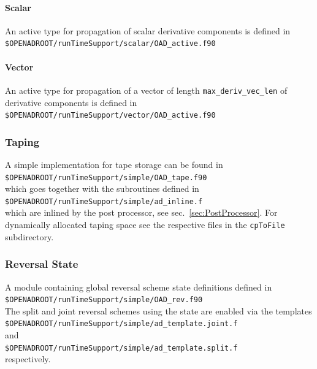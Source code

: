\documentclass{book}
\newcommand{\refsec}[1]{{sec.~\ref{#1}}}
\begin{document}
\paragraph{Scalar}
An active type for propagation of scalar derivative components is defined in \\[1ex]
\hspace*{.3cm}\lstinline{$OPENADROOT/runTimeSupport/scalar/OAD_active.f90} %

\paragraph{Vector}
An active type for propagation of a vector of length 
\lstinline{max_deriv_vec_len} of derivative components is defined in \\[1ex]
\hspace*{.3cm}\lstinline{$OPENADROOT/runTimeSupport/vector/OAD_active.f90} %

\subsubsection{Taping}
A simple implementation for  tape storage can be found in \\[1ex]
\hspace*{.3cm}\lstinline{$OPENADROOT/runTimeSupport/simple/OAD_tape.f90}\\[1ex] %
which goes together with the subroutines defined in \\[1ex]
\hspace*{.3cm}\lstinline{$OPENADROOT/runTimeSupport/simple/ad_inline.f}\\[1ex] %
which are inlined by the post processor, see \refsec{sec:PostProcessor}.
For dynamically allocated taping space see the respective files in the \lstinline{cpToFile}
subdirectory.

\subsubsection{Reversal State}
A module containing global reversal scheme state definitions defined in  \\[1ex]
\hspace*{.3cm}\lstinline{$OPENADROOT/runTimeSupport/simple/OAD_rev.f90}\\[1ex] %
The split and joint reversal schemes using the state are enabled via the templates \\[1ex]
\hspace*{.3cm}\lstinline{$OPENADROOT/runTimeSupport/simple/ad_template.joint.f}\\[1ex] %
and\\[1ex]
\hspace*{.3cm}\lstinline{$OPENADROOT/runTimeSupport/simple/ad_template.split.f}\\[1ex] %
respectively.
\end{document}
